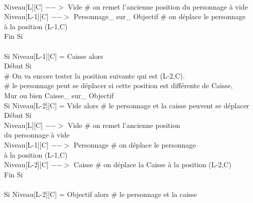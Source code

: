 \documentclass{article}
\begin{document}
\begin{tabbing}
\\	\hspace{4cm}		Niveau[L][C] $-->$ Vide 				\# on remet l'ancienne position du personnage à vide
\\	\hspace{4cm}		Niveau[L-1][C] $-->$ Personnage\_ sur\_ Objectif	\# on déplace le personnage
\\ \hspace{4cm} à la position (L-1,C)
\\	\hspace{3cm}	Fin Si 
\\		
\\	\hspace{3cm}	Si Niveau[L-1][C] = Caisse alors			
\\	\hspace{3cm}	Début Si
\\	\hspace{4cm}		\# On va encore tester la position suivante qui est (L-2,C). 
\\	\hspace{4cm}		\# le personnage peut se déplacer si cette position est différente de Caisse,
\\ \hspace{4cm} Mur ou bien Caisse\_ sur\_ Objectif
\\	\hspace{4cm}		Si Niveau[L-2][C] = Vide alors          \# le personnage et la caisse peuvent se déplacer
\\	\hspace{4cm}		Début Si
\\	\hspace{5cm}			Niveau[L][C] $-->$ Vide 		\# on remet l'ancienne position
\\ \hspace{5cm} du personnage à vide
\\	\hspace{5cm}			Niveau[L-1][C] $-->$ Personnage	\# on déplace le personnage
\\ \hspace{5cm} à la position (L-1,C)
\\	\hspace{5cm}			Niveau[L-2][C] $-->$ Caisse	\# on déplace la Caisse à la position (L-2,C)
\\	\hspace{4cm}		Fin Si
\\
\\	\hspace{4cm}			Si Niveau[L-2][C] = Objectif alors         	\# le personnage et la caisse

\end{tabbing}
\end{document}
